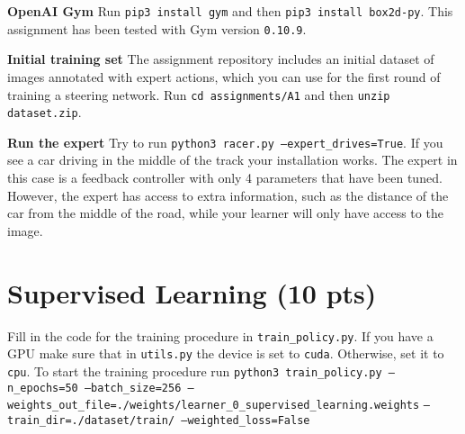 \documentclass[a4paper,10pt]{article}
\def\code#1{\texttt{#1}}
\begin{document}
\noindent \textbf{OpenAI Gym} Run \code{pip3 install gym} and then \code{pip3 install box2d-py}. This assignment has been tested with Gym version \code{0.10.9}. 
\newline

\noindent \textbf{Initial training set} The assignment repository includes an initial dataset of images annotated with expert actions, which you can use for the first round of training a steering network.
Run \code{cd assignments/A1} and then \code{unzip dataset.zip}.
\newline

\noindent \textbf{Run the expert} Try to run \code{python3 racer.py --expert\_drives=True}. If you see a car driving in the middle of the track your installation works. The expert in this case is a feedback
controller with only 4 parameters that have been tuned. However, the expert has access to extra information, such as the distance of the car from the middle of the road, while your learner will only have
access to the image. 



\section{Supervised Learning (10 pts)}
Fill in the code for the training procedure in \code{train\_policy.py}. If you have a GPU make sure that in \code{utils.py} the device is set to \code{cuda}. Otherwise, set it to \code{cpu}.   
To start the training procedure run \code{python3 train\_policy.py --n\_epochs=50 --batch\_size=256 --weights\_out\_file=./weights/learner\_0\_supervised\_learning.weights}
\newline \code{--train\_dir=./dataset/train/ --weighted\_loss=False}
\newline
\end{document}
